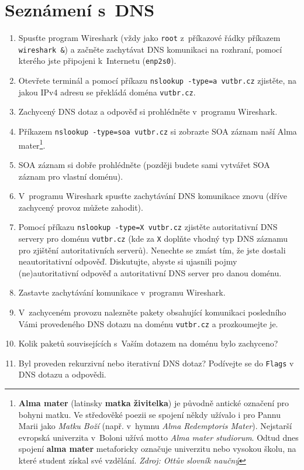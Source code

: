 \section{Seznámení s~DNS}
\begin{enumerate}
    \item Spusťte program Wireshark (vždy jako \texttt{root} z~příkazové řádky příkazem \texttt{wireshark \&}) a začněte zachytávat DNS komunikaci na rozhraní, pomocí kterého jste připojeni k~Internetu (\texttt{enp2s0}).
    \item Otevřete terminál a pomocí příkazu \texttt{nslookup -type=a vutbr.cz} zjistěte, na jakou IPv4 adresu se překládá doména \texttt{vutbr.cz}.
    \item Zachycený DNS dotaz a odpověď si prohlédněte v~programu Wireshark.
    \item Příkazem \texttt{nslookup -type=soa vutbr.cz} si zobrazte SOA záznam naší Alma mater\footnote{\textbf{Alma mater} (latinsky \textbf{matka živitelka}) je původně antické označení pro bohyni matku. Ve středověké poezii se spojení někdy užívalo i pro Pannu Marii jako \emph{Matku Boží} (např. v~hymnu \emph{Alma Redemptoris Mater}). Nejstarší evropská univerzita v~Boloni užívá motto \emph{Alma mater studiorum}. Odtud dnes spojení \textbf{alma mater} metaforicky označuje univerzitu nebo vysokou školu, na které student získal své vzdělání. \emph{Zdroj: Ottův slovník naučný}}.
    \item SOA záznam si dobře prohlédněte (později budete sami vytvářet SOA záznam pro vlastní doménu).
    \item V~programu Wireshark spusťte zachytávání DNS komunikace znovu (dříve zachycený provoz můžete zahodit).
    \item Pomocí příkazu \texttt{nslookup -type=X vutbr.cz} zjistěte autoritativní DNS servery pro doménu \texttt{vutbr.cz} (kde za \texttt{X} doplňte vhodný typ DNS záznamu pro zjištění autoritativních serverů). Nenechte se zmást tím, že jste dostali neautoritativní odpověď. Diskutujte, abyste si ujasnili pojmy (ne)autoritativní odpověď a autoritativní DNS server pro danou doménu.
    \item Zastavte zachytávání komunikace v~programu Wireshark.
    \item V~zachyceném provozu nalezněte pakety obsahující komunikaci posledního Vámi provedeného DNS dotazu na doménu \texttt{vutbr.cz} a prozkoumejte je.
    \item Kolik paketů souvisejících s~Vaším dotazem na doménu bylo zachyceno?
    \item Byl proveden rekurzivní nebo iterativní DNS dotaz? Podívejte se do \texttt{Flags} v DNS dotazu a odpovědi.

\end{enumerate}
